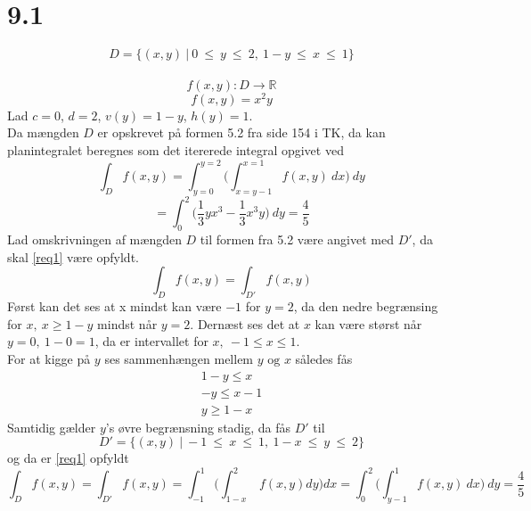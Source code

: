 \documentclass[11pt, fleqn]{article}
\begin{document}

\maketitle %
\section*{9.1}
\begin{equation}
\label{nostalgiccyborg}
D = \{(x,y)\ |\ 0\ \leq\ y\ \leq\ 2,\ 1-y\ \leq\ x\ \leq\ 1 \}
\end{equation}
\\
\[
	f(x,y) : D \to \mathbb{R}
\]
\begin{equation}
f(x,y) = x^2y
\end{equation}
Lad $c=0$, $d=2$, $v(y)=1-y$, $h(y)=1$. \\
Da mængden $D$ er opskrevet på formen 5.2 fra side 154 i TK, da kan planintegralet beregnes som det itererede integral opgivet ved 
\[
\int_D f(x,y) = \int^{y=2}_{y=0}\Bigg(\int^{x=1}_{x=y-1} f(x,y)\ dx \Bigg)\ dy
\]
\[
= \int^{2}_0 \bigg(\frac{1}{3}yx^3-\frac{1}{3}x^3y\bigg)\ dy = \frac{4}{5}
\]
Lad omskrivningen af mængden $D$ til formen fra 5.2 være angivet med $D'$, da skal \eqref{req1} være opfyldt. 
\begin{equation}
\label{req1}
\int_D f(x,y) = \int_{D'} f(x,y)
\end{equation}
Først kan det ses at x mindst kan være $-1$ for $y=2$, da den nedre begrænsing for $x,\ x\geq 1-y$ mindst når $y=2$. Dernæst ses det at $x$ kan være størst når $y=0,\ 1-0=1$, da er intervallet for $x,\ -1\leq x\leq 1$. \\
For at kigge på $y$ ses sammenhængen mellem $y \text{ og } x$ således fås 
\begin{align*}
1-y\leq x \\
-y \leq x-1 \\
y \geq 1-x
\end{align*}
Samtidig gælder $y$'s øvre begrænsning stadig, da fås $D'$ til 
\[
D'=\{(x,y)\ |\ -1\ \leq\ x\ \leq\ 1,\ 1-x\ \leq\ y\ \leq\ 2 \}
\]
og da er \eqref{req1} opfyldt 
\[
\int_{D} f(x,y) = 
\int_{D'} f(x,y) = 
\int_{-1}^1 \Bigg(\int_{1-x}^2\ f(x,y) dy \Bigg) dx = 
\int^{2}_{0}\Bigg(\int^{1}_{y-1} f(x,y)\ dx \Bigg)\ dy =  
\frac{4}{5}
\]
\end{document}
